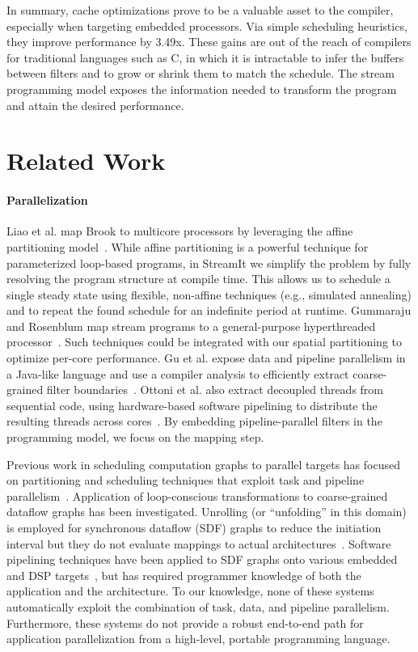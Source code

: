 In summary, cache optimizations prove to be a valuable asset to the
compiler, especially when targeting embedded processors.  Via simple
scheduling heuristics, they improve performance by 3.49x.  These gains
are out of the reach of compilers for traditional languages such as C,
in which it is intractable to infer the buffers between filters and to
grow or shrink them to match the schedule.  The stream programming
model exposes the information needed to transform the program and
attain the desired performance.

\section{Related Work}


\paragraph*{Parallelization}  Liao et al. map Brook to multicore processors 
by leveraging the affine partitioning model~\cite{liao06brook}.  While
affine partitioning is a powerful technique for parameterized
loop-based programs, in StreamIt we simplify the problem by fully
resolving the program structure at compile time.  This allows us to
schedule a single steady state using flexible, non-affine techniques
(e.g., simulated annealing) and to repeat the found schedule for an
indefinite period at runtime.  Gummaraju and Rosenblum map stream
programs to a general-purpose hyperthreaded
processor~\cite{gummaraju05micro}.  Such techniques could be
integrated with our spatial partitioning to optimize per-core
performance.  Gu et al. expose data and pipeline parallelism in a
Java-like language and use a compiler analysis to efficiently extract
coarse-grained filter boundaries~\cite{du03sc}.  Ottoni et al. also
extract decoupled threads from sequential code, using hardware-based
software pipelining to distribute the resulting threads across
cores~\cite{ottoni05decoupled}.  By embedding pipeline-parallel
filters in the programming model, we focus on the mapping step.

Previous work in scheduling computation graphs to parallel targets has
focused on partitioning and scheduling techniques that exploit task
and pipeline parallelism~\cite{SDFSched, SDFSched2,may87communicating,
DAGSched, pipeline-sdf}.  Application of loop-conscious
transformations to coarse-grained dataflow graphs has been
investigated.  Unrolling (or ``unfolding'' in this domain) is employed
for synchronous dataflow (SDF) graphs to reduce the initiation
interval but they do not evaluate mappings to actual
architectures~\cite{unfolding,unfolding2}. Software pipelining
techniques have been applied to SDF graphs onto various embedded and
DSP targets~\cite{bakshi99,chatha-02}, but has required programmer
knowledge of both the application and the architecture. To our
knowledge, none of these systems automatically exploit the combination
of task, data, and pipeline parallelism.  Furthermore, these systems
do not provide a robust end-to-end path for application
parallelization from a high-level, portable programming language.

